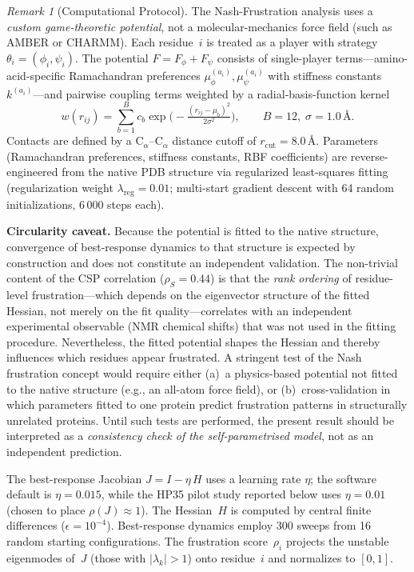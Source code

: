 \documentclass[12pt,a4paper]{article}
\theoremstyle{remark}
\newtheorem{remark}{Remark}
\begin{document}
\begin{remark}[Computational Protocol]\label{rem:comp-protocol}
The Nash-Frustration analysis uses a \emph{custom game-theoretic potential}, not a molecular-mechanics force field (such as AMBER or CHARMM).
Each residue~$i$ is treated as a player with strategy $\theta_i = (\phi_i, \psi_i)$.
The potential $F = F_\phi + F_\psi$ consists of single-player terms---amino-acid-specific Ramachandran preferences $\mu_\phi^{(a_i)}, \mu_\psi^{(a_i)}$ with stiffness constants~$k^{(a_i)}$---and pairwise coupling terms weighted by a radial-basis-function kernel
\[
  w(r_{ij}) = \sum_{b=1}^{B} c_b \exp\!\bigl(-\tfrac{(r_{ij}-\mu_b)^2}{2\sigma^2}\bigr),
  \qquad B=12,\; \sigma = 1.0\,\text{\AA}.
\]
Contacts are defined by a C$_\alpha$--C$_\alpha$ distance cutoff of $r_\text{cut} = 8.0$\,\AA.
Parameters (Ramachandran preferences, stiffness constants, RBF coefficients) are reverse-engineered from the native PDB structure via regularized least-squares fitting (regularization weight $\lambda_{\text{reg}} = 0.01$; multi-start gradient descent with 64 random initializations, 6\,000 steps each).

\textbf{Circularity caveat.} Because the potential is fitted to the native structure, convergence of best-response dynamics to that structure is expected by construction and does not constitute an independent validation. The non-trivial content of the CSP correlation ($\rho_S = 0.44$) is that the \emph{rank ordering} of residue-level frustration---which depends on the eigenvector structure of the fitted Hessian, not merely on the fit quality---correlates with an independent experimental observable (NMR chemical shifts) that was not used in the fitting procedure. Nevertheless, the fitted potential shapes the Hessian and thereby influences which residues appear frustrated. A stringent test of the Nash frustration concept would require either (a)~a physics-based potential not fitted to the native structure (e.g., an all-atom force field), or (b)~cross-validation in which parameters fitted to one protein predict frustration patterns in structurally unrelated proteins. Until such tests are performed, the present result should be interpreted as a \emph{consistency check of the self-parametrised model}, not as an independent prediction.

The best-response Jacobian $J = I - \eta\, H$ uses a learning rate $\eta$; the software default is $\eta = 0.015$, while the HP35 pilot study reported below uses $\eta = 0.01$ (chosen to place $\rho(J) \approx 1$). The Hessian~$H$ is computed by central finite differences ($\epsilon = 10^{-4}$).
Best-response dynamics employ 300 sweeps from 16 random starting configurations.
The frustration score~$\rho_i$ projects the unstable eigenmodes of~$J$ (those with $|\lambda_k| > 1$) onto residue~$i$ and normalizes to $[0,1]$.


\end{remark}
\end{document}
